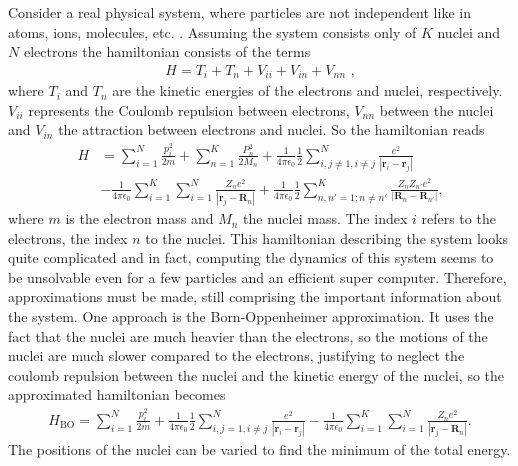 \documentclass[twoside,        %
			   12pt,			%
               BCOR10mm,       %
               ngerman,english  %
               ]{scrartcl}
\begin{document}
Consider a real physical system, where particles are not independent like in atoms, ions, molecules, etc. . Assuming the system consists only of $K$ nuclei and $N$ electrons the hamiltonian consists of the terms
\begin{align*}
    H = T_i + T_n+ V_{ii} + V_{in} + V_{nn} \text{ ,}
\end{align*} 
where $T_i $ and $T_n$ are the kinetic energies of the electrons and nuclei, respectively. $V_{ii}$ represents the Coulomb repulsion between electrons, $V_{nn}$ between the nuclei and $V_{in}$  the attraction between electrons and nuclei. So the hamiltonian reads
\begin{align*}
    H &= \sum_{i=1}^N \frac{p_i^2}{2m} + \sum_{n=1}^K \frac{P_n^2}{2M_n} + \frac{1}{4\pi \epsilon_0}\frac{1}{2}\sum_{i,j\neq 1, i \neq j}^N \frac{e^2}{|\mathbf{r}_i - \mathbf{r}_j|} \\ &-  \frac{1}{4\pi \epsilon_0}\sum_{i=1}^K \sum_{i=1}^N \frac{Z_n e^2}{|\mathbf{r}_j-\mathbf{R}_n|} +  \frac{1}{4\pi \epsilon_0}\frac{1}{2} \sum_{n,n'=1;n\neq n'}^K \frac{Z_n Z_{n'} e^2}{|\mathbf{R}_n - \mathbf{R}_{n'}|} \text{,}
\end{align*} where $m$ is the electron mass and $M_n$ the nuclei mass. The index $i$ refers to the electrons, the index $n$ to the nuclei.
This hamiltonian describing the system looks quite complicated and in fact, computing the dynamics of this system seems to be unsolvable even for a few particles and an efficient super computer. Therefore, approximations must be made, still comprising the important information about the system. One approach is the Born-Oppenheimer approximation. It uses the fact that the nuclei are much heavier than the electrons, so the motions of the nuclei are much slower compared to the electrons, justifying to neglect the coulomb repulsion between the nuclei and the kinetic energy of the nuclei, so the approximated hamiltonian becomes
\begin{align}\label{eq:H_BO}
H_\text{BO} = \sum_{i=1}^N \frac{p_i^2}{2m}  + \frac{1}{4\pi \epsilon_0}\frac{1}{2}\sum_{i,j = 1, i \neq j}^N \frac{e^2}{|\mathbf{r}_i - \mathbf{r}_j|} -  \frac{1}{4\pi \epsilon_0}\sum_{i=1}^K \sum_{i=1}^N \frac{Z_n e^2}{|\mathbf{r}_j-\mathbf{R}_n|}  \text{.}
\end{align}  
The positions of the nuclei can be varied to find the minimum of the total energy.
\end{document}
